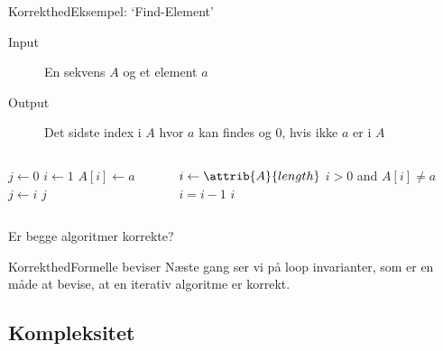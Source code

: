 \documentclass{beamer}
\begin{document}
\begin{frame}{Korrekthed}{Eksempel: `Find-Element'}
    \begin{description}
        \item[Input] En sekvens $A$ og et element $a$
        \item[Output] Det \alert{sidste} index i $A$ hvor $a$ kan findes og 0,
            hvis ikke $a$ er i $A$
    \end{description}

    \pause
    \begin{columns}

        \begin{codebox}
            \li $j \gets 0$
            \li \For $i \gets 1$ \To {} \Do
                \li \If $A[i] \gets a$ \Then
                    \li $j \gets i$
                \End
            \End
            \li \Return $j$
        \end{codebox}


        \begin{codebox}
            \li $i \gets \attrib{A}{length}$
            \li \While $i > 0$ and $A[i] \neq a$ \Then
                \li $i = i - 1$
            \End
            \li \Return $i$
        \end{codebox}

    \end{columns}

    \medskip
    Er begge algoritmer korrekte? 
\end{frame}

\begin{frame}{Korrekthed}{Formelle beviser}
    Næste gang ser vi på \alert{loop invarianter}, som er en måde at bevise, at
    en iterativ algoritme er korrekt.
\end{frame}

\subsection{Kompleksitet}
\end{document}

